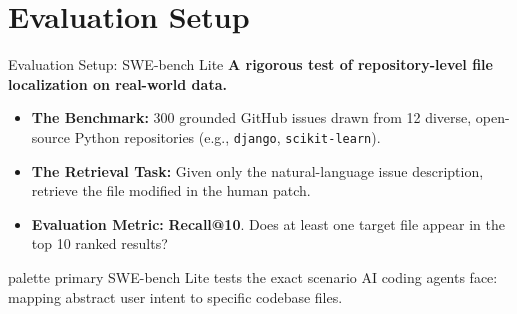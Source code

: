 \documentclass[aspectratio=169]{beamer}
\begin{document}
\section{Evaluation Setup}
\begin{frame}{Evaluation Setup: SWE-bench Lite}
  \textbf{A rigorous test of repository-level file localization on real-world data.}
  
  \vspace{0.3cm}
  \begin{itemize}
    \setlength\itemsep{1em}
    \item \textbf{The Benchmark:} 300 grounded GitHub issues drawn from 12 diverse, open-source Python repositories (e.g., \texttt{django}, \texttt{scikit-learn}).
    \item \textbf{The Retrieval Task:} Given only the natural-language issue description, retrieve the file modified in the human patch.
    \item \textbf{Evaluation Metric:} \textbf{Recall@10}. Does at least one target file appear in the top 10 ranked results?
  \end{itemize}
  
  \vspace{0.4cm}
  \centering
  \begin{beamercolorbox}[rounded=true, shadow=true, sep=8pt, center, wd=0.95\textwidth]{palette primary}
    \small SWE-bench Lite tests the exact scenario AI coding agents face:\\mapping abstract user intent to specific codebase files.
  \end{beamercolorbox}
\end{frame}
\end{document}
